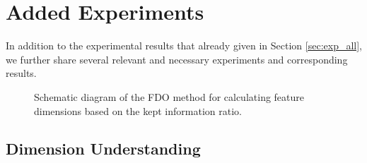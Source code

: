 \documentclass[sigconf]{acmart}
\begin{document}
\section{Added Experiments}
In addition to the experimental results that already given in Section \ref{sec:exp_all}, we further share several relevant and necessary experiments and corresponding results.

\begin{figure}[t]
\centering
{}



\centering
\caption{Schematic diagram of the FDO method for calculating feature dimensions based on the kept information ratio.}
\label{fig:fdo_understanding}
\end{figure}

\subsection{Dimension Understanding}
\end{document}
